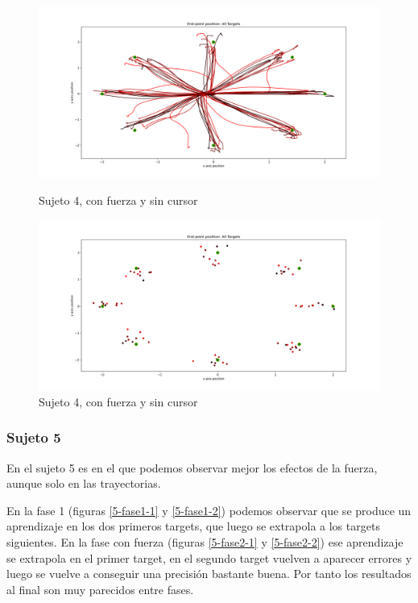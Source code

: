 \documentclass[a4paper,11pt, oneside]{book}
\begin{document}
\begin{figure}[H]
	\begin{minipage}[b]{0.5\linewidth}
		\centering
		\includegraphics[width=\linewidth]{sujeto4/force_no_cursor/trayectorias}
		\caption{Sujeto 4, con fuerza y sin cursor}
		\label{4-fase4-1}
	\end{minipage}
	\hspace{0.5cm}
	\begin{minipage}[b]{0.5\linewidth}
		\centering
		\includegraphics[width=\linewidth]{sujeto4/force_no_cursor/trayectorias_puntos}
		\caption{Sujeto 4, con fuerza y sin cursor}
		\label{4-fase4-2}
	\end{minipage}
\end{figure}



\subsubsection{Sujeto 5}

En el sujeto 5 es en el que podemos observar mejor los efectos de la fuerza, aunque solo en las trayectorias.

En la fase 1 (figuras \ref{5-fase1-1} y \ref{5-fase1-2}) podemos observar que se produce un aprendizaje en los dos primeros targets, que luego se extrapola a los targets siguientes. En la fase con fuerza (figuras \ref{5-fase2-1} y \ref{5-fase2-2}) ese aprendizaje se extrapola en el primer target, en el segundo target vuelven a aparecer errores y luego se vuelve a conseguir una precisión bastante buena. Por tanto los resultados al final son muy parecidos entre fases. 
\end{document}
